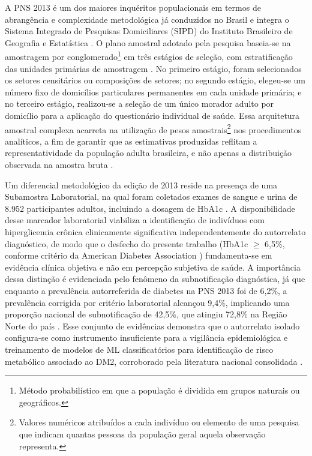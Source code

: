 A PNS 2013 é um dos maiores inquéritos populacionais em termos de abrangência e complexidade metodológica já conduzidos no Brasil e integra o Sistema Integrado de Pesquisas Domiciliares (SIPD) do Instituto Brasileiro de Geografia e Estatística \cite{IBGE-SIPD}. O plano amostral adotado pela pesquisa baseia-se na amostragem por conglomerado\footnote{Método probabilístico em que a população é dividida em grupos naturais ou geográficos.} em três estágios de seleção, com estratificação das unidades primárias de amostragem \cite{IBGE_PNS2013_Exames}. No primeiro estágio, foram selecionados os setores censitários ou composições de setores; no segundo estágio, elegeu-se um número fixo de domicílios particulares permanentes em cada unidade primária; e no terceiro estágio, realizou-se a seleção de um único morador adulto por domicílio para a aplicação do questionário individual de saúde. Essa arquitetura amostral complexa acarreta na utilização de pesos amostrais\footnote{Valores numéricos atribuídos a cada indivíduo ou elemento de uma pesquisa que indicam quantas pessoas da população geral aquela observação representa.} nos procedimentos analíticos, a fim de garantir que as estimativas produzidas reflitam a representatividade da população adulta brasileira, e não apenas a distribuição observada na amostra bruta \cite{IBGE_PNS2013_Exames}.

Um diferencial metodológico da edição de 2013 reside na presença de uma Subamostra Laboratorial, na qual foram coletados exames de sangue e urina de 8.952 participantes adultos, incluindo a dosagem de HbA1c \cite{IBGE_PNS2013_Exames}. A disponibilidade desse marcador laboratorial viabiliza a identificação de indivíduos com hiperglicemia crônica clinicamente significativa independentemente do autorrelato diagnóstico, de modo que o desfecho do presente trabalho (HbA1c $\geq$ 6,5\%, conforme critério da American Diabetes Association \cite{ADA2010}) fundamenta-se em evidência clínica objetiva e não em percepção subjetiva de saúde. A importância dessa distinção é evidenciada pelo fenômeno da subnotificação diagnóstica, já que enquanto a prevalência autorreferida de diabetes na PNS 2013 foi de 6,2\%, a prevalência corrigida por critério laboratorial alcançou 9,4\%, implicando uma proporção nacional de subnotificação de 42,5\%, que atingiu 72,8\% na Região Norte do país \cite{muzy2021prevalencia}. Esse conjunto de evidências demonstra que o autorrelato isolado configura-se como instrumento insuficiente para a vigilância epidemiológica e treinamento de modelos de ML classificatórios para identificação de risco metabólico associado ao DM2, corroborado pela literatura nacional consolidada \cite{iser2015prevalencia, reis2022evolution}.

